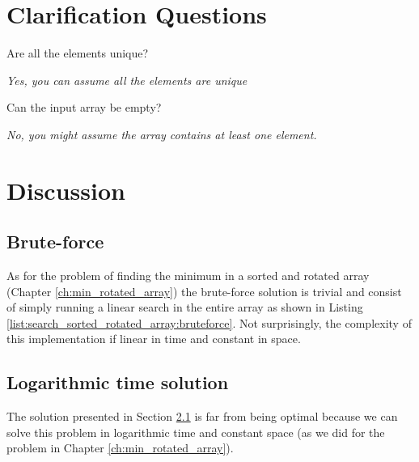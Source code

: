 \section{Clarification Questions}

\begin{QandA}
	\item Are all the elements unique? 
	\begin{answered}
		\textit{Yes, you can assume all the elements are unique}
	\end{answered}
	\item Can the input array be empty?
	\begin{answered}
		\textit{No, you might assume the array contains at least one element.}
	\end{answered}
\end{QandA}


\section{Discussion}
\label{search_sorted_rotated_array:sec:discussion}


\subsection{Brute-force}
\label{search_sorted_rotated_array:sec:bruteforce}
As for the problem of finding the minimum in a sorted and rotated array (Chapter \ref{ch:min_rotated_array}) the brute-force solution is trivial and consist of simply running a linear search in the entire array as shown in Listing \ref{list:search_sorted_rotated_array:bruteforce}.
Not surprisingly, the complexity of this implementation if linear in time and constant in space.



\subsection{Logarithmic time solution}
\label{search_sorted_rotated_array:sec:log}
The solution presented in Section \ref{search_sorted_rotated_array:sec:bruteforce} is far from being optimal because we can solve this problem in logarithmic time and constant space (as we did for the problem in Chapter \ref{ch:min_rotated_array}).


